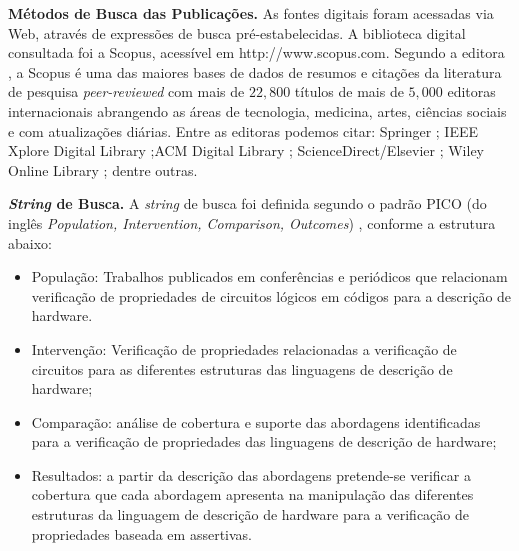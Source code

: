 \textbf{Métodos de Busca das Publicações.} As fontes digitais foram acessadas via Web, através de expressões de busca pré-estabelecidas. A biblioteca digital consultada foi a Scopus, acessível em http://www.scopus.com. Segundo a editora \citeauthor{Elsevier}, a Scopus é uma das maiores bases de dados de resumos e citações da literatura de pesquisa \textit{peer-reviewed} com mais de $22,800$ títulos de mais de $5,000$ editoras internacionais abrangendo as áreas de tecnologia, medicina, artes, ciências sociais e com atualizações diárias. Entre as editoras podemos citar: Springer \cite{Springer}; IEEE Xplore Digital Library \cite{IEEE};ACM Digital Library \cite{ACM} ; ScienceDirect/Elsevier \cite{B.V}; Wiley Online Library \cite{Sons}; dentre outras.

\textbf{\textit{String} de Busca.} A \textit{string} de busca foi definida segundo o padrão PICO (do inglês \textit{Population, Intervention, Comparison, Outcomes}) \cite{kitchenham2009systematic}, conforme a estrutura abaixo:
\begin{itemize}
	\item População: Trabalhos publicados em conferências e periódicos que relacionam verificação de propriedades de circuitos lógicos em códigos para a descrição de hardware.

	\item Intervenção: Verificação de propriedades relacionadas a verificação de circuitos para as diferentes estruturas das linguagens de descrição de hardware;

	\item Comparação: análise de cobertura e suporte das abordagens identificadas para a verificação de propriedades das linguagens de descrição de hardware;

	\item Resultados: a partir da descrição das abordagens pretende-se verificar a cobertura que cada abordagem apresenta na manipulação das diferentes estruturas da linguagem de descrição de hardware para a verificação de propriedades baseada em assertivas.
\end{itemize}

